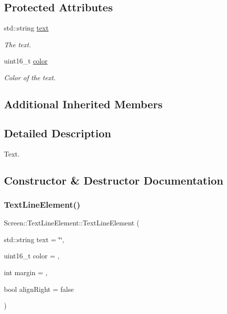 \subsection*{Protected Attributes}
\begin{DoxyCompactItemize}
\item 
\mbox{\label{classScreen_1_1TextLineElement_ad2495931e2dd28b0d7cb5d8c761dedad}} 
std\+::string \mbox{\hyperlink{classScreen_1_1TextLineElement_ad2495931e2dd28b0d7cb5d8c761dedad}{text}}
\begin{DoxyCompactList}\small\item\em The text. \end{DoxyCompactList}\item 
\mbox{\label{classScreen_1_1TextLineElement_ac4fa4d52ead8e4b38ba18c673875fae2}} 
uint16\+\_\+t \mbox{\hyperlink{classScreen_1_1TextLineElement_ac4fa4d52ead8e4b38ba18c673875fae2}{color}}
\begin{DoxyCompactList}\small\item\em Color of the text. \end{DoxyCompactList}\end{DoxyCompactItemize}
\subsection*{Additional Inherited Members}


\subsection{Detailed Description}
Text. 

\subsection{Constructor \& Destructor Documentation}
\mbox{\label{classScreen_1_1TextLineElement_ae0de60080a1c3f6c1be23448927e0717}} 
\subsubsection{\texorpdfstring{Text\+Line\+Element()}{TextLineElement()}\hspace{0.1cm}{\footnotesize\ttfamily [1/2]}}
{\footnotesize\ttfamily Screen\+::\+Text\+Line\+Element\+::\+Text\+Line\+Element (\begin{DoxyParamCaption}\item[{std\+::string}]{text = {\ttfamily \char`\"{}\char`\"{}},  }\item[{uint16\+\_\+t}]{color = {},  }\item[{int}]{margin = {},  }\item[{bool}]{align\+Right = {\ttfamily false} }\end{DoxyParamCaption})}



